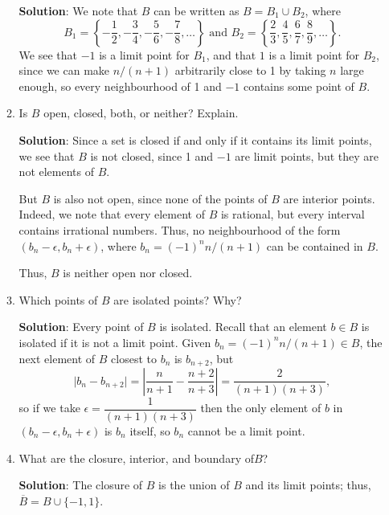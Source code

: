 \documentclass[12pt]{article}
\newcommand{\points}[1]{\marginpar{\hspace{24pt}[#1]}}
\newcommand{\abs}[1]{\lvert #1\rvert}
\begin{document}
\begin{enumerate}
\begin{enumerate}
\bigskip

{\bf Solution}: We note that $B$ can be written as $B = B_1\cup B_2$, where
\[
 B_1= \left\{-\frac{1}{2}, -\frac{3}{4}, -\frac{5}{6}, -\frac{7}{8},\ldots\right\} \text{ and } B_2= \left\{\frac{2}{3}, \frac{4}{5}, \frac{6}{7}, \frac{8}{9},\ldots\right\}.
\]
We see that $-1$ is a limit point for $B_1$, and that $1$ is a limit point for $B_2$, since we can make $n/(n+1)$ arbitrarily close to 1 by taking $n$ large enough, so every neighbourhood of 1 and $-1$ contains some point of $B$.

\bigskip

      \item Is $B$ open, closed, both, or neither? Explain.\points{2}

\bigskip

{\bf Solution}: Since a set is closed if and only if it contains its limit points, we see that $B$ is not closed, since 1 and $-1$ are limit points, but they are not elements of $B$. 

But $B$ is also not open, since none of the points of $B$ are interior points. Indeed, we note that every element of $B$ is rational, but every interval contains irrational numbers. Thus, no neighbourhood of the form $(b_n-\epsilon,b_n+\epsilon)$, where $b_n = (-1)^nn/(n+1)$ can be contained in $B$.

Thus, $B$ is neither open nor closed.

\newpage

      \item Which points of $B$ are isolated points? Why? \points{2}


\bigskip

{\bf Solution}: Every point of $B$ is isolated. Recall that an element $b\in B$ is isolated if it is not a limit point. Given $b_n = (-1)^nn/(n+1)\in B$, the next element of $B$ closest to $b_n$ is $b_{n+2}$, but
\[
 \abs{b_n-b_{n+2}} = \left|\frac{n}{n+1}-\frac{n+2}{n+3}\right| = \frac{2}{(n+1)(n+3)},
\]
so if we take $\epsilon = \dfrac{1}{(n+1)(n+3)}$ then the only element of $b$ in $(b_n-\epsilon,b_n+\epsilon)$ is $b_n$ itself, so $b_n$ cannot be a limit point.

\bigskip

      \item What are the closure, interior, and boundary of$B$? \points{3}


\bigskip

{\bf Solution}: The closure of $B$ is the union of $B$ and its limit points; thus,\\ $\overline{B} = B\cup\{-1,1\}$.


\end{enumerate}
\end{enumerate}
\end{document}

